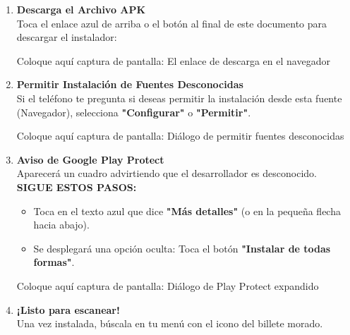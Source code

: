 \documentclass[11pt,a4paper]{article}
\begin{document}
\begin{enumerate}[label=\textbf{\arabic*.}, leftmargin=1.5cm, itemsep=2em]
    
    \item \textbf{Descarga el Archivo APK} \\
    Toca el enlace azul de arriba o el botón al final de este documento para descargar el instalador: \\
    \href{https://github.com/ErickFP7314/ticket-validation/releases/latest/download/app-release.apk}{\textbf{\color{linkBlue}{[CLICK AQUÍ PARA DESCARGAR EL APK]}}}
    
    \begin{screenshotbox}{Coloque aquí captura de pantalla: El enlace de descarga en el navegador}
    \end{screenshotbox}

    \item \textbf{Permitir Instalación de Fuentes Desconocidas} \\
    Si el teléfono te pregunta si deseas permitir la instalación desde esta fuente (Navegador), selecciona \textbf{"Configurar"} o \textbf{"Permitir"}.
    
    \begin{screenshotbox}{Coloque aquí captura de pantalla: Diálogo de permitir fuentes desconocidas}
    \end{screenshotbox}

    \item \textbf{Aviso de Google Play Protect} \\
    Aparecerá un cuadro advirtiendo que el desarrollador es desconocido. \\
    \textbf{SIGUE ESTOS PASOS:}
    \begin{itemize}[label=\textcolor{warningOrange}{$\rightarrow$}]
        \item Toca en el texto azul que dice \textbf{"Más detalles"} (o en la pequeña flecha hacia abajo).
        \item Se desplegará una opción oculta: Toca el botón \textbf{"Instalar de todas formas"}.
    \end{itemize}
    
    \begin{screenshotbox}{Coloque aquí captura de pantalla: Diálogo de Play Protect expandido}
    \end{screenshotbox}

    \item \textbf{¡Listo para escanear!} \\
    Una vez instalada, búscala en tu menú con el icono del billete morado.
\end{enumerate}
\end{document}
